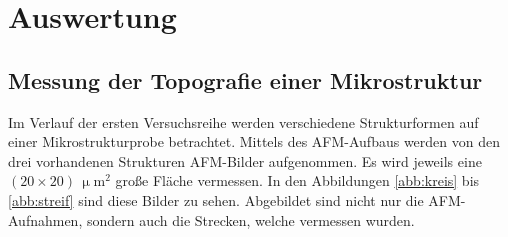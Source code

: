 \section{Auswertung}
\label{sec:Auswertung}
\subsection{Messung der Topografie einer Mikrostruktur}
Im Verlauf der ersten Versuchsreihe werden verschiedene Strukturformen auf einer Mikrostrukturprobe betrachtet.
Mittels des AFM-Aufbaus werden von den drei vorhandenen Strukturen AFM-Bilder aufgenommen.
Es wird jeweils eine $(20 \times 20) \, \upmu \text{m}^2$ gro{\ss}e Fl\"ache vermessen.
In den Abbildungen \ref{abb:kreis} bis \ref{abb:streif} sind diese Bilder zu sehen.
Abgebildet sind nicht nur die AFM-Aufnahmen, sondern auch die Strecken, welche vermessen wurden.
